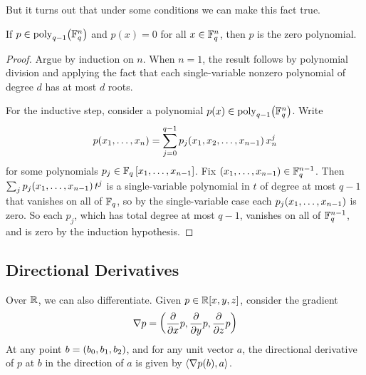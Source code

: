 But it turns out that under some conditions we can make this fact true.

\begin{boxlemma} \label{Ch7:Lemma:Vanishing_Everywhere}
    If $p \in \operatorname{poly}_{q - 1}\!\left( \mathbb{F}_q^n \right)$ and $p(x) = 0$ for all $x \in \mathbb{F}_q^n$, then $p$ is the zero polynomial.
\end{boxlemma}
\begin{proof}
    Argue by induction on $n$. When $n = 1$, the result follows by polynomial division and applying the fact that each single-variable nonzero polynomial of degree $d$ has at most $d$ roots.

    For the inductive step, consider a polynomial $p(x) \in \operatorname{poly}_{q - 1}\!\left( \mathbb{F}_q^n \right)$. Write
    \begin{align*}
        p\!\left( x_1, \ldots, x_n \right) = \sum_{j=0}^{q-1} p_j\!\left( x_1, x_2, \ldots, x_{n - 1} \right) x_n^j
    \end{align*}
    for some polynomials $p_j \in \mathbb{F}_{q}\left[ x_1, \ldots, x_{n-1} \right]$. Fix $\left( x_1, \ldots, x_{n-1} \right) \in \mathbb{F}_q^{n-1}$. Then $\sum_j p_j\!\left( x_1, \ldots, x_{n-1} \right) t^j$ is a single-variable polynomial in $t$ of degree at most $q - 1$ that vanishes on all of $\mathbb{F}_q$, so by the single-variable case each $p_j\!\left( x_1, \ldots, x_{n-1} \right)$ is zero. So each $p_j$, which has total degree at most $q - 1$, vanishes on all of $\mathbb{F}_q^{n-1}$, and is zero by the induction hypothesis.
\end{proof}

\subsection{Directional Derivatives}

Over $\mathbb{R}$, we can also differentiate. Given $p \in \mathbb{R}\!\left[ x, y, z \right]$, consider the gradient
\begin{align*}
    \nabla p = \left( \frac{\partial}{\partial x} p, \frac{\partial}{\partial y} p, \frac{\partial}{\partial z} p \right)
\end{align*}
At any point $b = \left( b_0, b_1, b_2 \right)$, and for any unit vector $a$, the directional derivative of $p$ at $b$ in the direction of $a$ is given by $\left\langle \nabla p (b), a \right\rangle$.

